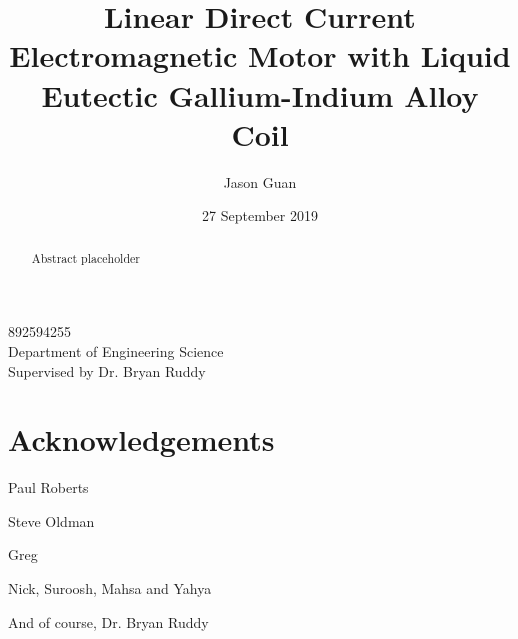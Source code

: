 \documentclass[a4paper,12pt]{article}
\title{Linear Direct Current Electromagnetic Motor with Liquid Eutectic Gallium-Indium Alloy Coil}
\author{Jason Guan}
\date{27 September 2019}
\begin{document}
\maketitle
\begin{center}
	892594255\\
	Department of Engineering Science\\
	Supervised by Dr. Bryan Ruddy
\end{center}

\newpage

\begin{abstract}
Abstract placeholder
\end{abstract}

\newpage

\section*{Acknowledgements}
Paul Roberts 

Steve Oldman 

Greg  

Nick, Suroosh, Mahsa and Yahya 

And of course, Dr. Bryan Ruddy 

\newpage

\tableofcontents

\newpage
\end{document}
